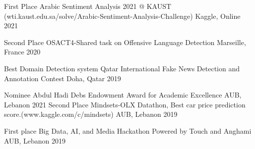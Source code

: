 



\begin{cvhonors}


    \cvhonor
    {First Place} %
    {Arabic Sentiment Analysis 2021 @ KAUST (wti.kaust.edu.sa/solve/Arabic-Sentiment-Analysis-Challenge)} %
    {Kaggle, Online} %
    {2021} %
    
  \cvhonor
    {Second Place} %
    {OSACT4-Shared task on Offensive Language Detection} %
    {Marseille, France} %
    {2020} %
    
  \cvhonor
    {Best Domain Detection system } %
    {Qatar International Fake News Detection and Annotation Contest} %
    {Doha, Qatar} %
    {2019} %

\end{cvhonors}




\begin{cvhonors}

  \cvhonor
    {Nominee} %
    {Abdul Hadi Debs Endowment Award for Academic Excellence} %
    {AUB, Lebanon} %
    {2021} %
  \cvhonor
    {Second Place} %
    {Mindsets-OLX Datathon, Best car price prediction score.(www.kaggle.com/c/mindsets)} %
    {AUB, Lebanon} %
    {2019} %

  \cvhonor
    {First place} %
    {Big Data, AI, and Media Hackathon Powered by Touch and Anghami} %
    {AUB, Lebanon} %
    {2019} %


\end{cvhonors}
